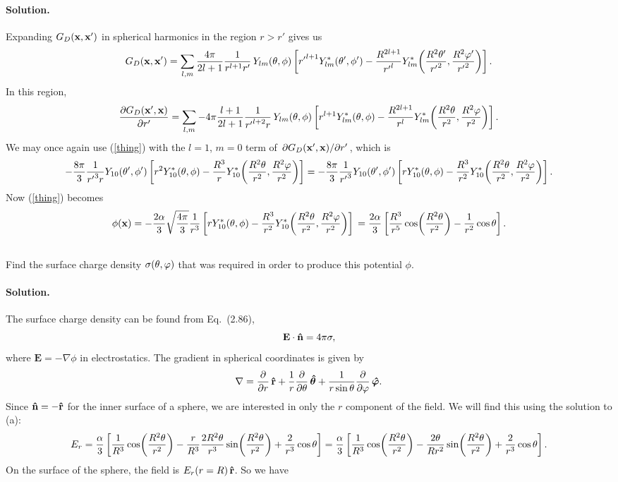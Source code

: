 \documentclass[11pt]{article}
\renewcommand{\vec}[1]{\mathbf{#1}}
\newcommand{\vfix}{\vspace{-\baselineskip}}
\newcommand{\refeq}[1]{(\ref{#1})}
\newcommand{\beq}{\begin{equation*}}
\newcommand{\eeq}{\end{equation*}}
\newcommand{\beqn}{\begin{equation}}
\newcommand{\eeqn}{\end{equation}}
\newenvironment{problem}
{
	\subsection{}
	\color{darkgray}
    \ignorespaces
}
{

}
\newenvironment{solution}
{
    \paragraph{Solution.}
    \ignorespaces
}
{
    \bigskip
}
\begin{document}
\begin{solution}
	Expanding $\Gdxxp$ in spherical harmonics in the region $r > r'$ gives us
	\beq
		\Gdxxp = \sum_{l,m} \frac{4\pi}{2l + 1} \frac{1}{r^{l+1} r'} \, \Ylm\tv \left[ {r'}^{l+1} \Ylm^*\tvp - \frac{R^{2l+1}}{{r'}^l} \Ylm^*\!\left( \frac{R^2 \tht'}{{r'}^2}, \frac{R^2 \vph'}{{r'}^2} \right) \right].
	\eeq
	In this region,
	\beq
		\pdv{\Gdxpx}{r'} = \sum_{l,m} -4\pi \frac{l + 1}{2l + 1} \frac{1}{{r'}^{l+2} r} \, \Ylm\tv \left[ r^{l+1} \Ylm^*\tv - \frac{R^{2l+1}}{r^l} \Ylm^*\!\left( \frac{R^2 \tht}{r^2}, \frac{R^2 \vph}{r^2} \right) \right].
	\eeq
	We may once again use \refeq{thing} with the $l = 1$, $m = 0$ term of $\pdv*{\Gdxpx}{r'}$, which is
	\beq
		-\frac{8\pi}{3} \frac{1}{{r'}^3 r} Y_{1 0}\tvp \left[ r^2 Y_{1 0}^*\tv - \frac{R^3}{r} Y_{1 0}^*\!\left( \frac{R^2 \tht}{r^2}, \frac{R^2 \vph}{r^2} \right) \right]
		= -\frac{8\pi}{3} \frac{1}{{r'}^3} Y_{1 0}\tvp \left[ r Y_{1 0}^*\tv - \frac{R^3}{r^2} Y_{1 0}^*\!\left( \frac{R^2 \tht}{r^2}, \frac{R^2 \vph}{r^2} \right) \right].
	\eeq
	Now \refeq{thing} becomes
	\beq
		\phix = -\frac{2\alp}{3} \sqfr{4\pi}{3} \frac{1}{r^3} \left[ r Y_{1 0}^*\tv - \frac{R^3}{r^2} Y_{1 0}^*\!\left( \frac{R^2 \tht}{r^2}, \frac{R^2 \vph}{r^2} \right) \right] \\
		= \frac{2\alp}{3} \left[ \frac{R^3}{r^5} \cos(\frac{R^2 \tht}{r^2}) - \frac{1}{r^2} \cost \right].
	\eeq
\end{solution}
\vfix

\newcommand{\vE}{\vec{E}}
\newcommand{\Er}{E_r}
\newcommand{\thh}{\boldsymbol{\hat{\tht}}}
\newcommand{\phh}{\boldsymbol{\hat{\vph}}}


\begin{problem}
	Find the surface charge density $\sigma(\theta, \varphi)$ that was required in order to produce this potential $\phi$.
\end{problem}

\begin{solution}
	The surface charge density can be found from Eq.~(2.86),
	\beqn \label{scdeq}
		\vE \cdot \nh = 4\pi \sig,
	\eeqn
	where $\vE = -\nabla \phi$ in electrostatics.  The gradient in spherical coordinates is given by
	\beq
		\nabla = \pdv{}{r} \,\rh + \frac{1}{r} \pdv{}{\tht} \,\thh + \frac{1}{r \sint} \pdv{}{\vph} \, \phh.
	\eeq
	Since $\nh = -\rh$ for the inner surface of a sphere, we are interested in only the $r$ component of the field.  We will find this using the solution to (a):
	\beq
		\Er = \frac{\alp}{3} \left[ \frac{1}{R^3} \cos(\frac{R^2 \tht}{r^2}) - \frac{r}{R^3} \frac{2 R^2 \tht}{r^3} \sin(\frac{R^2 \tht}{r^2}) + \frac{2}{r^3} \cost \right]
		= \frac{\alp}{3} \left[ \frac{1}{R^3} \cos(\frac{R^2 \tht}{r^2}) - \frac{2 \tht}{R r^2} \sin(\frac{R^2 \tht}{r^2}) + \frac{2}{r^3} \cost \right].
	\eeq
	  On the surface of the sphere, the field is $\Er(r=R) \,\rh$.  So we have

\end{solution}
\end{document}
